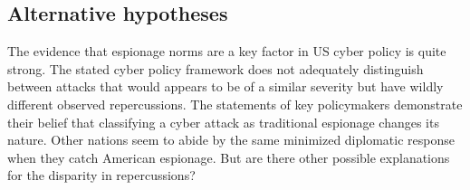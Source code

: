 \documentclass{memoir}
\begin{document}
\begin{refsegment}



\subsection{Alternative hypotheses}
The evidence that espionage norms are a key factor in US cyber policy is quite strong. The stated cyber policy framework does not adequately distinguish between attacks that would appears to be of a similar severity but have wildly different observed repercussions. The statements of key policymakers demonstrate their belief that classifying a cyber attack as traditional espionage changes its nature. Other nations seem to abide by the same minimized diplomatic response when they catch American espionage. But are there other possible explanations for the disparity in repercussions?


\end{refsegment}
\end{document}
